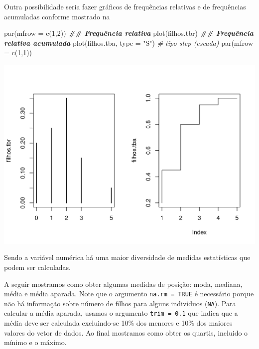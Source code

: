 \documentclass[
  10pt,
  a4paper]{book}
\newenvironment{Shaded}{\begin{snugshade}}{\end{snugshade}}
\newcommand{\AttributeTok}[1]{\textcolor[rgb]{0.77,0.63,0.00}{#1}}
\newcommand{\CommentTok}[1]{\textcolor[rgb]{0.56,0.35,0.01}{\textit{#1}}}
\newcommand{\DecValTok}[1]{\textcolor[rgb]{0.00,0.00,0.81}{#1}}
\newcommand{\DocumentationTok}[1]{\textcolor[rgb]{0.56,0.35,0.01}{\textbf{\textit{#1}}}}
\newcommand{\FunctionTok}[1]{\textcolor[rgb]{0.00,0.00,0.00}{#1}}
\newcommand{\NormalTok}[1]{#1}
\newcommand{\StringTok}[1]{\textcolor[rgb]{0.31,0.60,0.02}{#1}}
\begin{document}
Outra possibilidade seria fazer gráficos de frequências relativas e de
frequências acumuladas conforme mostrado na

\begin{Shaded}
\begin{Highlighting}[]
\FunctionTok{par}\NormalTok{(}\AttributeTok{mfrow =} \FunctionTok{c}\NormalTok{(}\DecValTok{1}\NormalTok{,}\DecValTok{2}\NormalTok{))}
\DocumentationTok{\#\# Frequência relativa}
\FunctionTok{plot}\NormalTok{(filhos.tbr)}
\DocumentationTok{\#\# Frequência relativa acumulada}
\FunctionTok{plot}\NormalTok{(filhos.tba, }\AttributeTok{type =} \StringTok{"S"}\NormalTok{) }\CommentTok{\# tipo step (escada)}
\FunctionTok{par}\NormalTok{(}\AttributeTok{mfrow =} \FunctionTok{c}\NormalTok{(}\DecValTok{1}\NormalTok{,}\DecValTok{1}\NormalTok{))}
\end{Highlighting}
\end{Shaded}

\begin{center}\includegraphics{figures/unnamed-chunk-301-1} \end{center}

Sendo a variável numérica há uma maior diversidade de medidas
estatísticas que podem ser calculadas.

A seguir mostramos como obter algumas medidas de posição: moda, mediana,
média e média aparada. Note que o argumento \texttt{na.rm\ =\ TRUE} é necessário
porque não há informação sobre número de filhos para alguns indivíduos
(\texttt{NA}). Para calcular a média aparada, usamos o argumento \texttt{trim\ =\ 0.1}
que indica que a média deve ser calculada excluindo-se 10\% dos menores e
10\% dos maiores valores do vetor de dados. Ao final mostramos como obter
os quartis, incluido o mínimo e o máximo.
\end{document}
